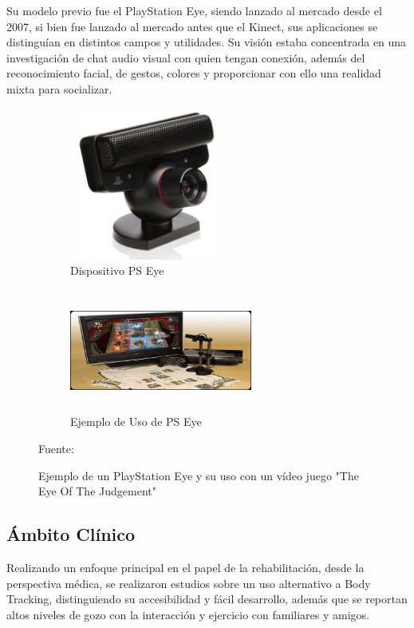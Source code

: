 Su modelo previo fue el PlayStation Eye, siendo lanzado al mercado desde el 2007, si bien fue lanzado al mercado antes que el Kinect, sus aplicaciones se distinguían en distintos campos y utilidades. Su visión estaba concentrada en una investigación de chat audio visual con quien tengan conexión, además del reconocimiento facial, de gestos, colores y proporcionar con ello una realidad mixta para socializar.
\begin{figure}
	\centering
	\begin{subfigure}{0.5\textwidth}
		\centering
		\includegraphics[width=5cm,height=5cm,]{./Images/eyeex.jpg}
		\caption{Dispositivo PS Eye}
		\label{eyeex}
	\end{subfigure}%
	\begin{subfigure}{0.5\textwidth}
		\centering
		\includegraphics[width=6cm,height=4cm,]{./Images/eyeexuse.jpg}
		\caption{Ejemplo de Uso de PS Eye}
		\label{eyeexuse}
	\end{subfigure}
	\caption{Ejemplo de un PlayStation Eye y su uso con un vídeo juego "The Eye Of The Judgement"}
	\footnotesize Fuente: \cite{eyeex} \cite{eyeexuse}
	\label{eyeExample}
\end{figure}

\subsection{Ámbito Clínico}
Realizando un enfoque principal en el papel de la rehabilitación, desde la perspectiva médica, se realizaron estudios sobre un uso alternativo a Body Tracking, distinguiendo su accesibilidad y fácil desarrollo, además que se reportan altos niveles de gozo con la interacción y ejercicio con familiares y amigos. 

